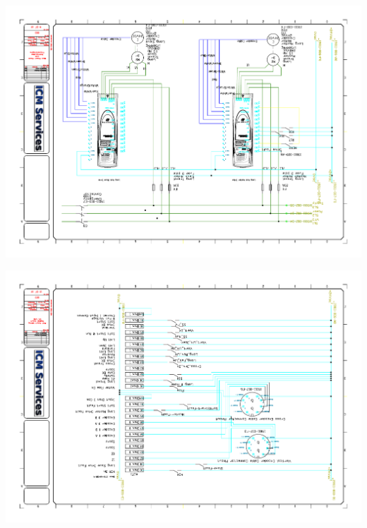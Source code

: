\begin{center}
	\includegraphics[width=7.5in,angle=90]{../DRAWINGS/19011-008.pdf}
	\label{schem:008} %
\end{center}
\begin{center}
	\includegraphics[width=7.5in,angle=90]{../DRAWINGS/19011-009.pdf}
	\label{schem:009} %
\end{center}

